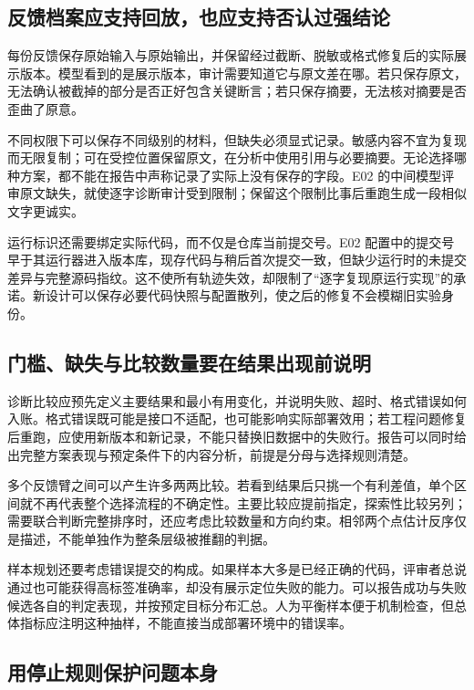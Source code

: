 \subsection{反馈档案应支持回放，也应支持否认过强结论}

每份反馈保存原始输入与原始输出，并保留经过截断、脱敏或格式修复后的实际展示版本。模型看到的是展示版本，审计需要知道它与原文差在哪。若只保存原文，无法确认被截掉的部分是否正好包含关键断言；若只保存摘要，无法核对摘要是否歪曲了原意。

不同权限下可以保存不同级别的材料，但缺失必须显式记录。敏感内容不宜为复现而无限复制；可在受控位置保留原文，在分析中使用引用与必要摘要。无论选择哪种方案，都不能在报告中声称记录了实际上没有保存的字段。E02 的中间模型评审原文缺失，就使逐字诊断审计受到限制；保留这个限制比事后重跑生成一段相似文字更诚实。

运行标识还需要绑定实际代码，而不仅是仓库当前提交号。E02 配置中的提交号早于其运行器进入版本库，现存代码与稍后首次提交一致，但缺少运行时的未提交差异与完整源码指纹。这不使所有轨迹失效，却限制了“逐字复现原运行实现”的承诺。新设计可以保存必要代码快照与配置散列，使之后的修复不会模糊旧实验身份。

\subsection{门槛、缺失与比较数量要在结果出现前说明}

诊断比较应预先定义主要结果和最小有用变化，并说明失败、超时、格式错误如何入账。格式错误既可能是接口不适配，也可能影响实际部署效用；若工程问题修复后重跑，应使用新版本和新记录，不能只替换旧数据中的失败行。报告可以同时给出完整方案表现与预定条件下的内容分析，前提是分母与选择规则清楚。

多个反馈臂之间可以产生许多两两比较。若看到结果后只挑一个有利差值，单个区间就不再代表整个选择流程的不确定性。主要比较应提前指定，探索性比较另列；需要联合判断完整排序时，还应考虑比较数量和方向约束。相邻两个点估计反序仅是描述，不能单独作为整条层级被推翻的判据。

样本规划还要考虑错误提交的构成。如果样本大多是已经正确的代码，评审者总说通过也可能获得高标签准确率，却没有展示定位失败的能力。可以报告成功与失败候选各自的判定表现，并按预定目标分布汇总。人为平衡样本便于机制检查，但总体指标应注明这种抽样，不能直接当成部署环境中的错误率。

\subsection{用停止规则保护问题本身}

